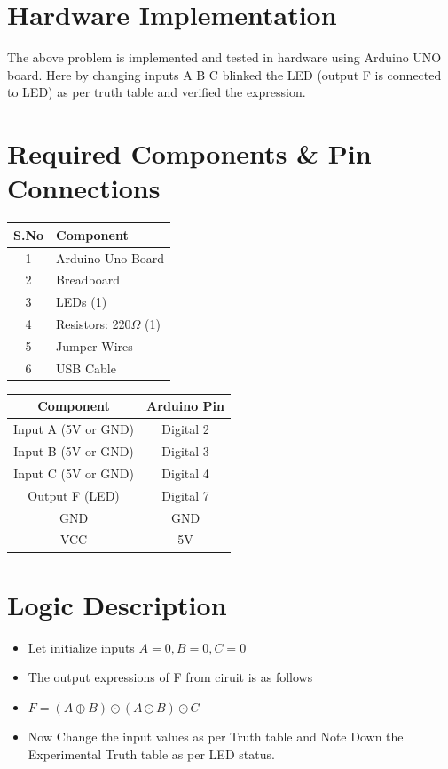 \documentclass[a4paper,12pt]{article}
\begin{document}
\section*{\textbf{Hardware Implementation}}
The above problem is implemented and tested in hardware using Arduino UNO board. Here by changing inputs A B C blinked the LED (output F is connected to LED) as per truth table and verified the expression.
\section*{Required Components \& Pin Connections}
\begin{center}
\begin{minipage}{0.45\textwidth}
\begin{table}[H]
\centering
\begin{tabular}{|c|l|}
\hline
\textbf{S.No} & \textbf{Component} \\ \hline
1 & Arduino Uno Board \\
2 & Breadboard \\
3 & LEDs (1) \\
4 & Resistors: 220$\Omega$ (1) \\
5 & Jumper Wires \\
6 & USB Cable \\
\hline
\end{tabular}
\end{table}
\end{minipage}
\hspace{0.05\textwidth}
\begin{minipage}{0.45\textwidth}
\begin{table}[H]
\centering
\begin{tabular}{|c|c|}
\hline
\textbf{Component} & \textbf{Arduino Pin} \\ \hline
Input A (5V or GND) & Digital 2 \\
Input B (5V or GND) & Digital 3 \\
Input C (5V or GND) & Digital 4 \\
Output F (LED) & Digital 7 \\
GND & GND \\
VCC & 5V \\
\hline
\end{tabular}
\end{table}
\end{minipage}
\end{center}
\section*{Logic Description}
\begin{itemize}
	\item Let initialize inputs $A=0,B=0,C=0$
	\item The output expressions of F from ciruit is as follows
	\item $F=(A\oplus B)\odot (A\odot B)\odot C$
	\item Now Change the input values as per Truth table and Note Down the Experimental Truth table as per LED status.
\end{itemize}
\end{document}
